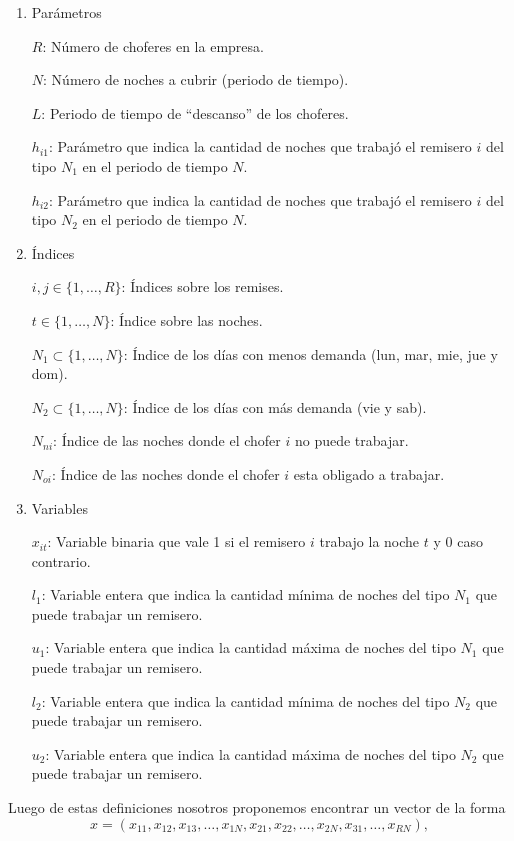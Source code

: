 \documentclass[12pt]{article}
\begin{document}
\begin{enumerate}
 \item Parámetros
 
 $R$: Número de choferes en la empresa.
 
 $N$: Número de noches a cubrir (periodo de tiempo).
 
 $L$: Periodo de tiempo de ``descanso'' de los choferes.
 
 $h_{i1}$: Parámetro que indica la cantidad de noches que trabajó el remisero $i$ del tipo $N_1$ en el periodo de tiempo $N$.
 
 $h_{i2}$: Parámetro que indica la cantidad de noches que trabajó el remisero $i$ del tipo $N_2$ en el periodo de tiempo $N$.
 
 \item Índices
 
 $i,j\in\{1,\ldots,R\}$: Índices sobre los remises.
 
 $t\in\{1,\ldots,N\}$: Índice sobre las noches.
 
 $N_1\subset\{1,\ldots,N\}$: Índice de los días con menos demanda (lun, mar, mie, jue y dom).
 
 $N_2\subset\{1,\ldots,N\}$: Índice de los días con más demanda (vie y sab).
 
 $N_{ni}$: Índice de las noches donde el chofer $i$ no puede trabajar.
 
 $N_{oi}$: Índice de las noches donde el chofer $i$ esta obligado a trabajar.
 
 \item Variables
 
 $x_{it}$: Variable binaria que vale 1 si el remisero $i$ trabajo la noche $t$ y 0 caso contrario.
 
 $l_1$: Variable entera que indica la cantidad mínima de noches del tipo $N_1$ que puede trabajar un remisero.
 
 $u_1$: Variable entera que indica la cantidad máxima de noches del tipo $N_1$ que puede trabajar un remisero.
 
 $l_2$: Variable entera que indica la cantidad mínima de noches del tipo $N_2$ que puede trabajar un remisero.
 
 $u_2$: Variable entera que indica la cantidad máxima de noches del tipo $N_2$ que puede trabajar un remisero.
 
\end{enumerate}

Luego de estas definiciones nosotros proponemos encontrar un vector de la forma
$$x=(x_{11},x_{12},x_{13},\ldots,x_{1N},x_{21},x_{22},\ldots,x_{2N},x_{31},\ldots,x_{RN}),$$
\end{document}
